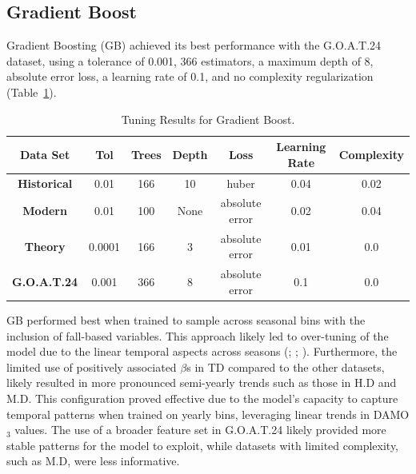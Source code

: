 \subsection{Gradient Boost} \label{rlts:gb} Gradient Boosting (GB) achieved its best performance with the G.O.A.T.24 dataset, using a tolerance of 0.001, 366 estimators, a maximum depth of 8, absolute error loss, a learning rate of 0.1, and no complexity regularization (Table~\ref{tab:gb_model_tuning}). \begin{table}[h!]
    \centering
        \begin{tabular}{||c|cccccc||}
            \hline 
            \textbf{Data Set} & \textbf{Tol} & \textbf{Trees} & \textbf{Depth} & \textbf{Loss} & \textbf{Learning Rate} &  \textbf{Complexity} \\
            \hline \hline
            \textbf{Historical} & 0.01 & 166 & 10 & huber & 0.04 & 0.02 \\[3pt] 
            \textbf{Modern} & 0.01 & 100 & None & absolute error & 0.02 & 0.04 \\[3pt] 
            \textbf{Theory} & 0.0001 & 166 & 3 & absolute error & 0.01 & 0.0 \\[3pt] 
            \textbf{G.O.A.T.24} & 0.001 & 366 & 8 & absolute error & 0.1 & 0.0 \\
            \hline
        \end{tabular}
    \caption{Tuning Results for Gradient Boost.} 
    \label{tab:gb_model_tuning}
\end{table} GB performed best when trained to sample across seasonal bins with the inclusion of fall-based variables. This approach likely led to over-tuning of the model due to the linear temporal aspects across seasons (\cite{choi_summertime_2012}; \cite{guan_summer_2023}; \cite{oltmans_seasonal_1992}). Furthermore, the limited use of positively associated $\beta$s in TD compared to the other datasets, likely resulted in more pronounced semi-yearly trends such as those in H.D and M.D. This configuration proved effective due to the model’s capacity to capture temporal patterns when trained on yearly bins, leveraging linear trends in DAMO$_3$ values. The use of a broader feature set in G.O.A.T.24 likely provided more stable patterns for the model to exploit, while datasets with limited complexity, such as M.D, were less informative. 

